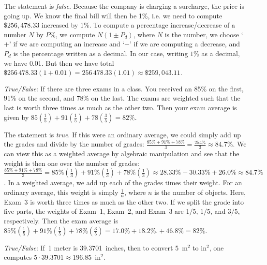 \documentclass[11pt,letterpaper]{article}
\begin{document}
\sol The statement is \textit{false}. Because the company is charging a surcharge, the price is going up. We know the final bill will then be 1\%, i.e. we need to compute $\$256,478.33$ increased by 1\%. To compute a percentage increase/decrease of a number $N$ by $P\%$, we compute $N( 1 \pm P_d)$, where $N$ is the number, we choose `$+$' if we are computing an increase and `$-$' if we are computing a decrease, and $P_d$ is the percentage written as a decimal. In our case, writing $1$\% as a decimal, we have $0.01$. But then we have total $\$256\,478.33(1 + 0.01)= 256\,478.33(1.01) \approx \$259,043.11$.





\newpage





\quizsol \textit{True/False}: If there are three exams in a class. You received an 85\% on the first, 91\% on the second, and 78\% on the last. The exams are weighted such that the last is worth three times as much as the other two. Then your exam average is given by $85 \left( \frac{1}{5} \right) + 91 \left( \frac{1}{5} \right) + 78 \left( \frac{3}{5} \right)= 82\%$. \pspace

\sol The statement is \textit{true}. If this were an ordinary average, we could simply add up the grades and divide by the number of grades: $\frac{85\% + 91\% + 78\%}{3}= \frac{254\%}{3} \approx 84.7\%$. We can view this as a weighted average by algebraic manipulation and see that the weight is then one over the number of grades: $\frac{85\% + 91\% + 78\%}{3}= 85\% (\frac{1}{3}) + 91\% (\frac{1}{3}) + 78\% (\frac{1}{3}) \approx 28.33\% + 30.33\% + 26.0\% \approx 84.7\%$. In a weighted average, we add up each of the grades times their weight. For an ordinary average, this weight is simply $\frac{1}{n}$, where $n$ is the number of objects. Here, Exam~3 is worth three times as much as the other two. If we split the grade into five parts, the weights of Exam~1, Exam~2, and Exam~3 are $1/5$, $1/5$, and $3/5$, respectively. Then the exam average is $85\% (\frac{1}{5}) + 91\% (\frac{1}{5}) + 78\% (\frac{3}{5})= 17.0\% + 18.2\%.+ 46.8\%= 82\%$. \vfill



\quizsol \textit{True/False}: If~1 meter is 39.3701~inches, then to convert 5~m$^2$ to in$^2$, one computes $5 \cdot 39.3701 \approx 196.85$~in$^2$. \pspace
\end{document}
